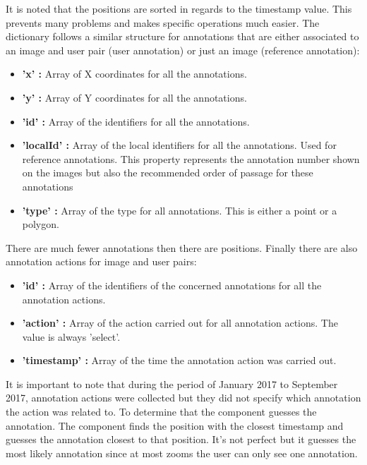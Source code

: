 \documentclass[a4paper,11pt]{report}
\numberwithin{figure}{chapter} %
\begin{document}
    It is noted that the positions are sorted in regards to the timestamp value.
    This prevents many problems and makes specific operations much easier.
    The dictionary follows a similar structure for annotations that are either associated to an image and user pair (user annotation) or just an image (reference annotation):
    \begin{itemize}
        \item[\textbullet] \textbf{'x' :} Array of X coordinates for all the annotations.
        \item[\textbullet] \textbf{'y' :} Array of Y coordinates for all the annotations.
        \item[\textbullet] \textbf{'id' :} Array of the identifiers for all the annotations.
        \item[\textbullet] \textbf{'localId' :} Array of the local identifiers for all the annotations.
        Used for reference annotations.
        This property represents the annotation number shown on the images but also the recommended order of passage for these annotations
        \item[\textbullet] \textbf{'type' :} Array of the type for all annotations.
        This is either a point or a polygon.
    \end{itemize}

    There are much fewer annotations then there are positions.
    Finally there are also annotation actions for image and user pairs:
    \begin{itemize}
        \item[\textbullet] \textbf{'id' :} Array of the identifiers of the concerned annotations for all the annotation actions.
        \item[\textbullet] \textbf{'action' :} Array of the action carried out for all annotation actions.
        The value is always 'select'.
        \item[\textbullet] \textbf{'timestamp' :} Array of the time the annotation action was carried out.
    \end{itemize}
    It is important to note that during the period of January 2017 to September 2017, annotation actions were collected but they did not specify which annotation the action was related to.
    To determine that the component guesses the annotation.
    The component finds the position with the closest timestamp and guesses the annotation closest to that position.
    It's not perfect but it guesses the most likely annotation since at most zooms the user can only see one annotation.\\
\end{document}
